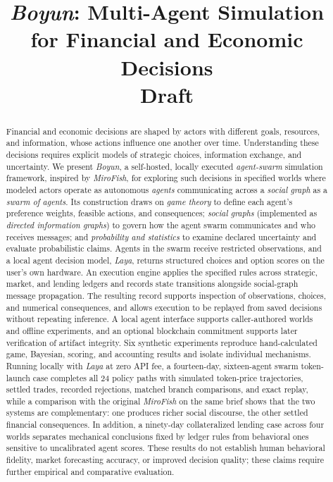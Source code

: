 \documentclass[10pt,conference,compsocconf]{IEEEtran}
\title{\textit{Boyun}: Multi-Agent Simulation\\for Financial and Economic Decisions\\\large Draft}
\author{\IEEEauthorblockN{Cherry Q}}
\newcommand{\rev}[1]{{\color{revisedred}#1}}
\begin{document}
\raggedbottom
\maketitle
\begin{abstract}
Financial and economic decisions are shaped by actors with different goals,
resources, and information, whose actions influence one another over time.
Understanding these decisions requires explicit models of strategic choices,
information exchange, and uncertainty. We present \textit{Boyun}, a
self-hosted, locally executed \rev{\textit{agent-swarm}} simulation framework,
\rev{inspired by \textit{MiroFish},} for exploring such decisions in specified
worlds \rev{where modeled actors operate as autonomous \textit{agents}
communicating across a \textit{social graph} as a \textit{swarm of agents}}. Its
construction draws on \textit{game theory} to define \rev{each agent's}
preference weights, feasible actions, and consequences; \rev{\textit{social
graphs} (implemented as \textit{directed information graphs}) to govern how the
agent swarm communicates and} who receives messages; and \textit{probability and
statistics} to examine declared uncertainty and evaluate probabilistic claims.
\rev{Agents in the swarm} receive restricted observations, and a local
\rev{agent} decision model, \textit{Laya}, returns structured choices and option
scores on the user's own hardware. An execution engine applies the specified
rules across strategic, market, and lending ledgers and records state
transitions \rev{alongside social-graph message propagation}. The resulting
record supports inspection of observations, choices, and numerical consequences,
and allows execution to be replayed from saved decisions without repeating
inference. A local agent interface supports caller-authored worlds and offline
experiments, and an optional blockchain commitment supports later verification
of artifact integrity. Six synthetic experiments reproduce hand-calculated
game, Bayesian, scoring, and accounting results and isolate individual
mechanisms. Running locally with \textit{Laya} at zero API fee, a
fourteen-day, \rev{sixteen-agent swarm} token-launch case completes all 24
policy paths with \rev{simulated token-price trajectories,} settled trades,
recorded rejections, matched branch comparisons, and exact replay, while a
comparison with the original \textit{MiroFish} on the same brief shows that the
two systems are complementary: one produces richer social discourse, the other
settled financial consequences. In addition, a ninety-day collateralized lending
case across four worlds separates mechanical conclusions fixed by ledger rules
from behavioral ones sensitive to uncalibrated \rev{agent} scores. These results
do not establish human behavioral fidelity, market forecasting accuracy, or
improved decision quality; these claims require further empirical and
comparative evaluation.
\end{abstract}
\end{document}
